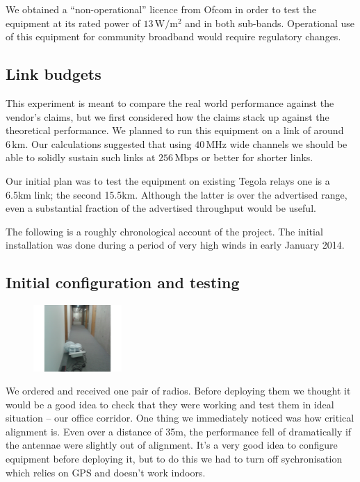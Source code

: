 \documentclass{amsart}
\begin{document}
We obtained a ``non-operational'' licence from Ofcom in order to test the equipment at its rated
  power of  $13\,\text{W}/\text{m}^2$ and in both sub-bands. Operational
  use of this equipment for community broadband would require
  regulatory changes.



\subsection{Link budgets}

This experiment is meant to compare the real world performance against
the vendor's claims, but we first considered how the claims stack up
against the theoretical performance. We planned to run this equipment
on a link of around
$6\,\text{km}$. Our calculations suggested that
using $40\,\text{MHz}$ wide channels we should be able to solidly
sustain such links at $256\,\text{Mbps}$ or better for shorter links.

Our initial plan was to test the equipment on existing Tegola
relays one is a 6.5km link; the second 15.5km. Although the latter is
over the advertised range, even a substantial fraction of the
advertised throughput would be useful.

The following is a roughly chronological account of the project.
The initial installation was done during a period of very high winds
in early January 2014.

\subsection{Initial configuration and testing}
\label{december-2013-initial-configuration-and-testing}

\begin{figure}
\includegraphics[width=0.3\textwidth]{radio-in-corridor}
\end{figure}
We ordered and received one pair of radios. Before deploying them
we thought it would be a good idea to check that they were working
and test them in ideal situation -- our office corridor. One thing
we immediately noticed was how critical alignment is. Even over
a distance of 35m, the performance fell of dramatically if the
antennae were slightly out of alignment. It's a very good idea to
configure equipment before deploying it, but to do this we had to turn
off sychronisation which relies on GPS and doesn't work indoors.
\end{document}
